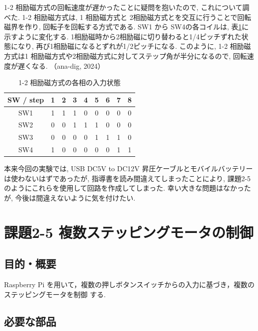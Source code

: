 \documentclass{ltjsarticle} %
\begin{document}
1-2 相励磁⽅式の回転速度が遅かったことに疑問を抱いたので, これについて調べた. 1-2 相励磁⽅式は, 1 相励磁⽅式と
2相励磁⽅式とを交互に⾏うことで回転磁界を作り, 回転⼦を回転する⽅式である. 
SW1 から SW4の各コイルは, 表\ref{tab:motor1-2}に示すように変化する. 
1相励磁時から2相励磁に切り替わると1/4ピッチずれた状態になり, 
再び1相励磁になるとずれが1/2ピッチになる. 
このように, 1-2 相励磁⽅式は1 相励磁⽅式や2相励磁⽅式に対してステップ角が半分になるので, 回転速度が遅くなる. 
（ana-dig, 2024）


\begin{table}[H] %
  \centering %
  \caption{1-2 相励磁⽅式の各相の入力状態}
  \begin{tabular}{|c|c|c|c|c|c|c|c|c|} 
  \hline %
  SW / step & 1 & 2 & 3 & 4 & 5 & 6 & 7 & 8\\ \hline %
  SW1 & 1 & 1 & 1 & 0 & 0 & 0 & 0 & 0\\ \hline
  SW2 & 0 & 0 & 1 & 1 & 1 & 0 & 0 & 0\\ \hline
  SW3 & 0 & 0 & 0 & 0 & 1 & 1 & 1 & 0\\ \hline
  SW4 & 1 & 0 & 0 & 0 & 0 & 0 & 1 & 1\\ \hline

  \end{tabular}
  \label{tab:motor1-2} %
\end{table}

本来今回の実験では, USB DC5V to DC12V 昇圧ケーブルとモバイルバッテリーは使わないはずであったが, 指導書を読み間違えてしまったことにより, 
課題2-5のようにこれらを使用して回路を作成してしまった. 幸い大きな問題はなかったが, 今後は間違えないように気を付けたい.


\section{課題2-5 複数ステッピングモータの制御}

\subsection{目的・概要}
Raspberry Pi を⽤いて，複数の押しボタンスイッチからの⼊⼒に基づき，複数のステッピングモータを制御
する.

\subsection{必要な部品}
\end{document}
